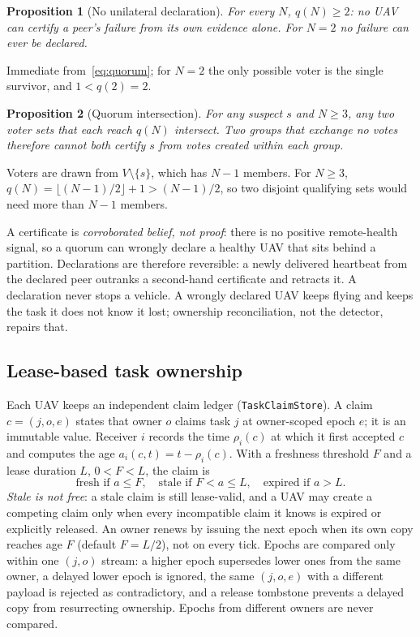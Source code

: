 \documentclass[conference]{IEEEtran}
\newcommand{\code}[1]{\texttt{#1}}    %
\newtheorem{proposition}{Proposition}
\begin{document}
\begin{proposition}[No unilateral declaration]
\label{prop:floor}
For every $N$, $q(N)\ge 2$: no UAV can certify a peer's failure from its own
evidence alone. For $N=2$ no failure can ever be declared.
\end{proposition}
\begin{IEEEproof}
Immediate from~\eqref{eq:quorum}; for $N=2$ the only possible voter is the
single survivor, and $1<q(2)=2$.
\end{IEEEproof}

\begin{proposition}[Quorum intersection]
\label{prop:intersection}
For any suspect $s$ and $N\ge 3$, any two voter sets that each reach $q(N)$
intersect. Two groups that exchange no votes therefore cannot both certify
$s$ from votes created within each group.
\end{proposition}
\begin{IEEEproof}
Voters are drawn from $V\setminus\{s\}$, which has $N-1$ members. For $N\ge3$,
$q(N)=\lfloor (N-1)/2\rfloor+1>(N-1)/2$, so two disjoint qualifying sets
would need more than $N-1$ members.
\end{IEEEproof}

A certificate is \emph{corroborated belief, not proof}: there is no positive
remote-health signal, so a quorum can wrongly declare a healthy UAV that sits
behind a partition. Declarations are therefore reversible: a newly delivered
heartbeat from the declared peer outranks a second-hand certificate and
retracts it. A declaration never stops a vehicle. A wrongly declared UAV keeps
flying and keeps the task it does not know it lost; ownership reconciliation,
not the detector, repairs that.

\subsection{Lease-based task ownership}
\label{sec:leases}

Each UAV keeps an independent claim ledger (\code{TaskClaimStore}). A claim
$c=(j,o,e)$ states that owner $o$ claims task $j$ at owner-scoped epoch $e$;
it is an immutable value. Receiver $i$ records the time $\rho_i(c)$ at which
it first accepted $c$ and computes the age $a_i(c,t)=t-\rho_i(c)$. With a
freshness threshold $F$ and a lease duration $L$, $0<F<L$, the claim is
\begin{equation}
  \text{fresh if } a\le F,\quad
  \text{stale if } F<a\le L,\quad
  \text{expired if } a>L .
  \label{eq:lease}
\end{equation}
\emph{Stale is not free}: a stale claim is still lease-valid, and a UAV may
create a competing claim only when every incompatible claim it knows is
expired or explicitly released. An owner renews by issuing the next epoch
when its own copy reaches age $F$ (default $F=L/2$), not on every tick.
Epochs are compared only within one $(j,o)$ stream: a higher epoch supersedes
lower ones from the same owner, a delayed lower epoch is ignored, the same
$(j,o,e)$ with a different payload is rejected as contradictory, and a release
tombstone prevents a delayed copy from resurrecting ownership. Epochs from
different owners are never compared.
\end{document}
